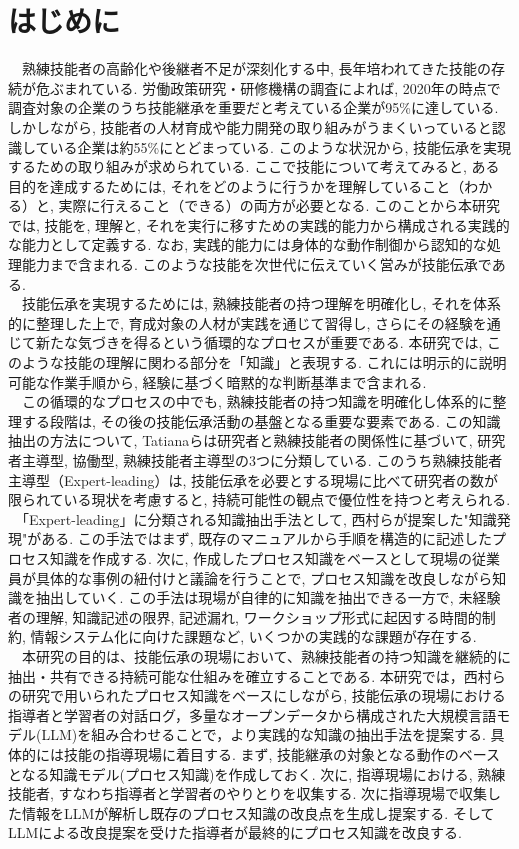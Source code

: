 \chapter{はじめに}
　熟練技能者の高齢化や後継者不足が深刻化する中, 長年培われてきた技能の存続が危ぶまれている. 労働政策研究・研修機構の調査によれば, 2020年の時点で調査対象の企業のうち技能継承を重要だと考えている企業が95\%に達している. しかしながら, 技能者の人材育成や能力開発の取り組みがうまくいっていると認識している企業は約55\%にとどまっている\cite{JILPT2020}. このような状況から, 技能伝承を実現するための取り組みが求められている. ここで技能について考えてみると, ある目的を達成するためには, それをどのように行うかを理解していること（わかる）と, 実際に行えること（できる）の両方が必要となる. このことから本研究では, 技能を, 理解と, それを実行に移すための実践的能力から構成される実践的な能力として定義する. なお, 実践的能力には身体的な動作制御から認知的な処理能力まで含まれる. このような技能を次世代に伝えていく営みが技能伝承である.\\
　技能伝承を実現するためには, 熟練技能者の持つ理解を明確化し, それを体系的に整理した上で, 育成対象の人材が実践を通じて習得し, さらにその経験を通じて新たな気づきを得るという循環的なプロセスが重要である. 本研究では, このような技能の理解に関わる部分を「知識」と表現する. これには明示的に説明可能な作業手順から, 経験に基づく暗黙的な判断基準まで含まれる.\\
　この循環的なプロセスの中でも, 熟練技能者の持つ知識を明確化し体系的に整理する段階は, その後の技能伝承活動の基盤となる重要な要素である. この知識抽出の方法について, Tatianaらは研究者と熟練技能者の関係性に基づいて, 研究者主導型, 協働型, 熟練技能者主導型の3つに分類している\cite{Tatiana2012}. このうち熟練技能者主導型（Expert-leading）は, 技能伝承を必要とする現場に比べて研究者の数が限られている現状を考慮すると, 持続可能性の観点で優位性を持つと考えられる.\\
　「Expert-leading」に分類される知識抽出手法として, 西村らが提案した"知識発現"\cite{Nishimura2017}がある. この手法ではまず, 既存のマニュアルから手順を構造的に記述したプロセス知識を作成する. 次に, 作成したプロセス知識をベースとして現場の従業員が具体的な事例の紐付けと議論を行うことで, プロセス知識を改良しながら知識を抽出していく. この手法は現場が自律的に知識を抽出できる一方で, 未経験者の理解, 知識記述の限界, 記述漏れ, ワークショップ形式に起因する時間的制約, 情報システム化に向けた課題など, いくつかの実践的な課題が存在する.\\
　本研究の目的は、技能伝承の現場において、熟練技能者の持つ知識を継続的に抽出・共有できる持続可能な仕組みを確立することである. 本研究では，西村らの研究\cite{Nishimura2017}で用いられたプロセス知識をベースにしながら, 技能伝承の現場における指導者と学習者の対話ログ，多量なオープンデータから構成された大規模言語モデル(LLM)を組み合わせることで，より実践的な知識の抽出手法を提案する. 具体的には技能の指導現場に着目する. まず, 技能継承の対象となる動作のベースとなる知識モデル(プロセス知識)を作成しておく. 次に, 指導現場における, 熟練技能者, すなわち指導者と学習者のやりとりを収集する. 次に指導現場で収集した情報をLLMが解析し既存のプロセス知識の改良点を生成し提案する. そしてLLMによる改良提案を受けた指導者が最終的にプロセス知識を改良する.\\
